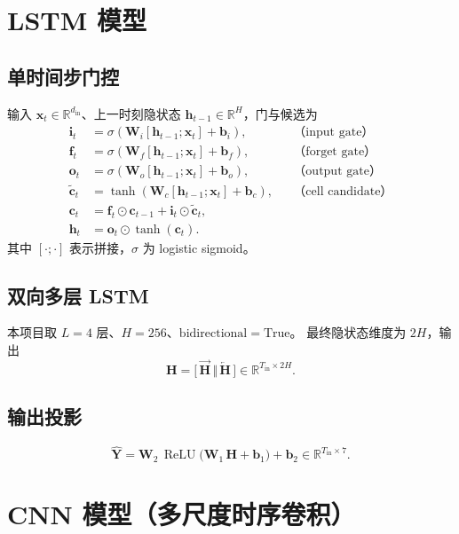 \documentclass[11pt,a4paper]{article}
\newcommand{\R}{\mathbb{R}}
\DeclareMathOperator{\ReLU}{ReLU}
\newcommand{\mat}[1]{\bm{#1}}
\newcommand{\vect}[1]{\bm{#1}}
\begin{document}
\section{LSTM 模型}

\subsection{单时间步门控}
输入 $\vect{x}_t \in \R^{d_{\text{in}}}$、上一时刻隐状态 $\vect{h}_{t-1}\in\R^{H}$，门与候选为
\begin{align}
\vect{i}_t &= \sigma(\mat{W}_i [\vect{h}_{t-1};\vect{x}_t] + \vect{b}_i), &&\text{（input gate）}\\
\vect{f}_t &= \sigma(\mat{W}_f [\vect{h}_{t-1};\vect{x}_t] + \vect{b}_f), &&\text{（forget gate）}\\
\vect{o}_t &= \sigma(\mat{W}_o [\vect{h}_{t-1};\vect{x}_t] + \vect{b}_o), &&\text{（output gate）}\\
\widetilde{\vect{c}}_t &= \tanh(\mat{W}_c [\vect{h}_{t-1};\vect{x}_t] + \vect{b}_c), &&\text{（cell candidate）}\\
\vect{c}_t &= \vect{f}_t \odot \vect{c}_{t-1} + \vect{i}_t \odot \widetilde{\vect{c}}_t,\\
\vect{h}_t &= \vect{o}_t \odot \tanh(\vect{c}_t).
\end{align}
其中 $[\cdot;\cdot]$ 表示拼接，$\sigma$ 为 logistic sigmoid。

\subsection{双向多层 LSTM}
本项目取 $L = 4$ 层、$H = 256$、$\mathrm{bidirectional} = \mathrm{True}$。
最终隐状态维度为 $2H$，输出
\[
\mat{H} = \bigl[\,\overrightarrow{\mat{H}}\,\Vert\,\overleftarrow{\mat{H}}\,\bigr] \in \R^{T_{\text{in}} \times 2H}.
\]

\subsection{输出投影}
\[
\widehat{\mat{Y}} = \mat{W}_2\,\ReLU\!\bigl(\mat{W}_1\,\mat{H} + \vect{b}_1\bigr) + \vect{b}_2 \in \R^{T_{\text{in}} \times 7}.
\]

\section{CNN 模型（多尺度时序卷积）}
\end{document}
